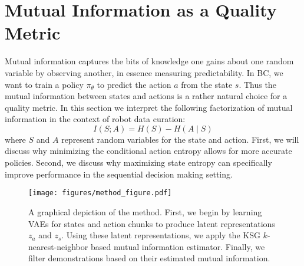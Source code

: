 
\section{Mutual Information as a Quality Metric}
\label{sec:method:mutual-information}
Mutual information captures the bits of knowledge one gains about one random variable by observing another, in essence measuring predictability. In BC, we want to train a policy $\pi_\theta$ to predict the action $a$ from the state $s$. Thus the mutual information between states and actions is a rather natural choice for a quality metric. In this section we interpret the following factorization of mutual information in the context of robot data curation:
\begin{equation}
    I(S;A) = H(S) - H(A \mid S)
\label{eq:mi}
\end{equation}
where $S$ and $A$ represent random variables for the state and action. First, we will discuss why minimizing the conditional action entropy allows for more accurate policies. Second, we discuss why maximizing state entropy can specifically improve performance in the sequential decision making setting. 

\begin{figure*}
    \centering
    \texttt{[image: figures/method\_figure.pdf]}
    \vspace{-0.1in}
    \caption{A graphical depiction of the \abv method. First, we begin by learning VAEs for states and action chunks to produce latent representations $z_a$ and $z_s$. Using these latent representations, we apply the KSG $k$-nearest-neighbor based mutual information estimator. Finally, we filter demonstrations based on their estimated mutual information.}
    \label{fig:method}
\end{figure*}


